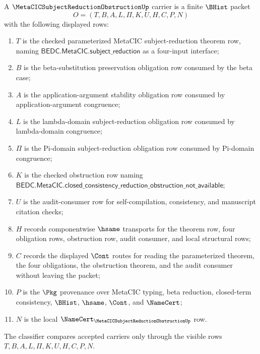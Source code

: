 \begin{definition}
\label{def:metacic-subject-reduction-obstruction-carrier}
A $\MetaCICSubjectReductionObstructionUp$ carrier is a finite $\BHist$ packet
$$
O=(T,B,A,L,\Pi,K,U,H,C,P,N)
$$
with the following displayed rows:
\begin{enumerate}
\item $T$ is the checked parameterized MetaCIC subject-reduction theorem row, naming $\mathsf{BEDC.MetaCIC.subject\_reduction}$ as a four-input interface;
\item $B$ is the beta-substitution preservation obligation row consumed by the beta case;
\item $A$ is the application-argument stability obligation row consumed by application-argument congruence;
\item $L$ is the lambda-domain subject-reduction obligation row consumed by lambda-domain congruence;
\item $\Pi$ is the Pi-domain subject-reduction obligation row consumed by Pi-domain congruence;
\item $K$ is the checked obstruction row naming $\mathsf{BEDC.MetaCIC.closed\_consistency\_reduction\_obstruction\_not\_available}$;
\item $U$ is the audit-consumer row for self-compilation, consistency, and manuscript citation checks;
\item $H$ records componentwise $\hsame$ transports for the theorem row, four obligation rows, obstruction row, audit consumer, and local structural rows;
\item $C$ records the displayed $\Cont$ routes for reading the parameterized theorem, the four obligations, the obstruction theorem, and the audit consumer without leaving the packet;
\item $P$ is the $\Pkg$ provenance over MetaCIC typing, beta reduction, closed-term consistency, $\BHist$, $\hsame$, $\Cont$, and $\NameCert$;
\item $N$ is the local $\NameCert_{\MetaCICSubjectReductionObstructionUp}$ row.
\end{enumerate}
The classifier compares accepted carriers only through the visible rows $T,B,A,L,\Pi,K,U,H,C,P,N$.
\end{definition}


